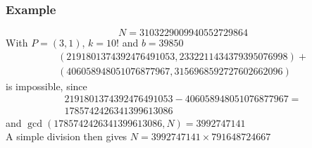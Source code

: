 \documentclass{beamer}
\begin{document}
\begin{frame} %
\frametitle{Example}
$$ N = 3103229009940552729864$$
With $P = (3,1)$, $k=10!$ and $b = 39850$
\begin{align*}
(2191801374392476491053, 2332211434379395076998) + \\
(406058948051076877967, 3156968592727602662096)
\end{align*}
is impossible, since 
\begin{align*}
2191801374392476491053-406058948051076877967 =\\
1785742426341399613086
\end{align*}
and $\gcd(1785742426341399613086, N) = 3992747141$\\
A simple division then gives $N = 3992747141 \times 791648724667$
\end{frame}
\end{document}
